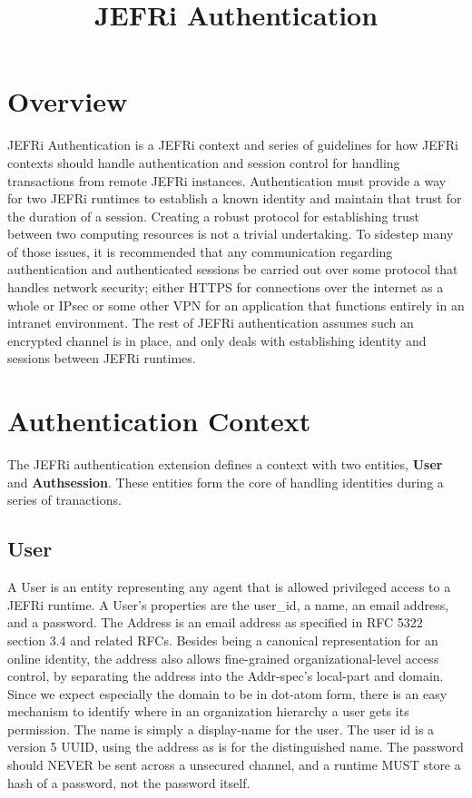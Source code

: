 \documentclass{article}
\begin{document}
\title{JEFRi Authentication}
\maketitle
\tableofcontents
\newpage
\linespread{1.6}

\section{Overview}
JEFRi Authentication is a JEFRi context and series of guidelines for how JEFRi
contexts should handle authentication and session control for handling
transactions from remote JEFRi instances. Authentication must provide a way for
two JEFRi runtimes to establish a known identity and maintain that trust for the
duration of a session. Creating a robust protocol for establishing trust between
two computing resources is not a trivial undertaking. To sidestep many of those
issues, it is recommended that any communication regarding authentication and
authenticated sessions be carried out over some protocol that handles network
security; either HTTPS for connections over the internet as a whole or IPsec or
some other VPN for an application that functions entirely in an intranet
environment. The rest of JEFRi authentication assumes such an encrypted channel
is in place, and only deals with establishing identity and sessions between
JEFRi runtimes.

\section{Authentication Context}
The JEFRi authentication extension defines a context with two entities, {\bf
User} and {\bf Authsession}. These entities form the core of handling identities
during a series of tranactions.

\subsection{User}
A User is an entity representing any agent that is allowed privileged access to
a JEFRi runtime. A User's properties are the user\_id, a name, an email address,
and a password. The Address is an email address as specified in RFC 5322 section
3.4 and related RFCs. Besides being a canonical representation for an online
identity, the address also allows fine-grained organizational-level access
control, by separating the address into the Addr-spec's local-part and domain.
Since we expect especially the domain to be in dot-atom form, there is an easy
mechanism to identify where in an organization hierarchy a user gets its
permission. The name is simply a display-name for the user. The user id is a
version 5 UUID, using the address as is for the distinguished name. The password
should NEVER be sent across a unsecured channel, and a runtime MUST store a hash
of a password, not the password itself.
\end{document}
